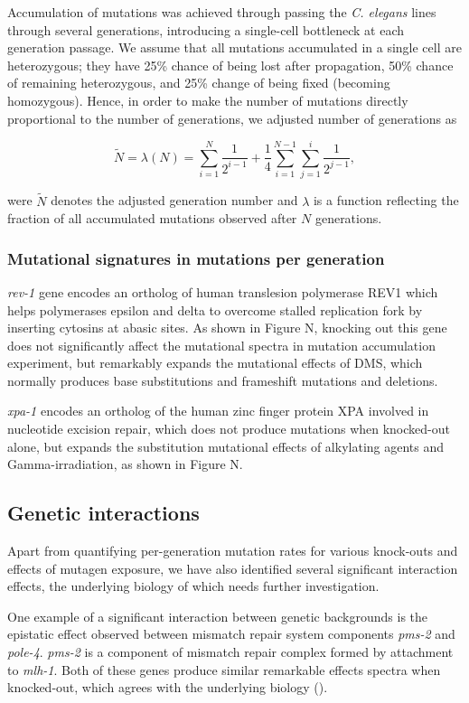 Accumulation of mutations was achieved through passing the \textit{C. elegans} 
lines through several generations, introducing a single-cell bottleneck at each 
generation passage. We assume that all mutations accumulated in a single cell 
are heterozygous; they have 25\% chance of being lost after propagation, 50\% 
chance of remaining heterozygous, and 25\% change of being fixed (becoming homozygous). 
Hence, in order to make the number of mutations directly proportional to the number of 
generations, we adjusted number of generations as

\[\tilde{N} = \lambda(N) = \sum_{i=1}^{N} \frac{1}{2^{i-1}} + \frac{1}{4} \sum_{i=1}^{N-1} \sum_{j=1}^{i} \frac{1}{2^{j-1}},\]

were $\tilde{N}$ denotes the adjusted generation number and $\lambda$ is a 
function reflecting the fraction of all accumulated mutations observed after $N$ generations.


\subsubsection*{Mutational signatures in mutations per generation}

\textit{rev-1} gene encodes an ortholog of human translesion polymerase REV1 which 
helps polymerases epsilon and delta to overcome stalled replication fork by inserting 
cytosins at abasic sites. As shown in Figure N, knocking out this gene does not 
significantly affect the mutational spectra in mutation accumulation experiment, 
but remarkably expands the mutational effects of DMS, which normally produces 
base substitutions and frameshift mutations and deletions.

\textit{xpa-1} encodes an ortholog of the human zinc finger protein XPA involved in nucleotide excision repair, which does not produce mutations when knocked-out alone, but expands the substitution mutational effects of alkylating agents and Gamma-irradiation, as shown in Figure N.


\subsection{Genetic interactions}

Apart from quantifying per-generation mutation rates for various knock-outs 
and effects of mutagen exposure, we have also identified several significant 
interaction effects, the underlying biology of which needs further investigation.

One example of a significant interaction between genetic backgrounds is the 
epistatic effect observed between mismatch repair system components \textit{pms-2} 
and \textit{pole-4}. \textit{pms-2} is a component of mismatch repair complex 
formed by attachment to \textit{mlh-1}. Both of these genes produce similar 
remarkable effects spectra when knocked-out, which agrees with the underlying biology 
(\cite{Denver2005-jh}).

